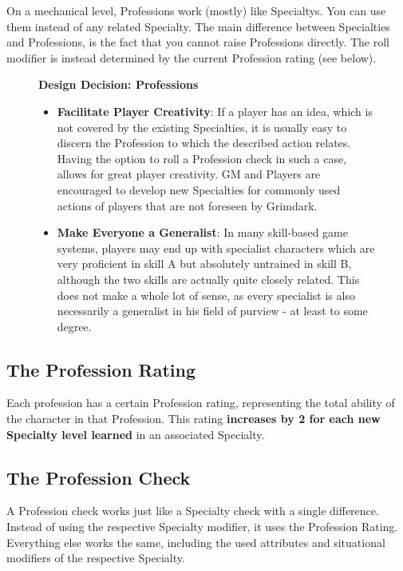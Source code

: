 On a mechanical level, Professions work (mostly) like Specialtys.
You can use them instead of any related Specialty.
The main difference between Specialties and Professions, is the fact that you cannot raise Professions directly.
The roll modifier is instead determined by the current Profession rating (see below).

\begin{figure}[hb]
	\begin{DndReadAloud}
	\textbf{Design Decision: Professions}
	\begin{itemize}
		\item \textbf{Facilitate Player Creativity}: If a player has an idea, which is not covered by the existing Specialties, it is usually easy to discern the Profession to which the described action relates. Having the option to roll a Profession check in such a case, allows for great player creativity. GM and Players are encouraged to develop new Specialties for commonly used actions of players that are not foreseen by Grimdark.
		\item \textbf{Make Everyone a Generalist}: In many skill-based game systems, players may end up with specialist characters which are very proficient in skill A but absolutely untrained in skill B, although the two skills are actually quite closely related. This does not make a whole lot of sense, as every specialist is also necessarily a generalist in his field of purview - at least to some degree.
		\end{itemize}
	\end{DndReadAloud}
\end{figure}

\subsection{The Profession Rating}
Each profession has a certain Profession rating, representing the total ability of the character in that Profession. 
This rating \textbf{increases by 2 for each new Specialty level learned} in an associated Specialty.

\subsection{The Profession Check}
A Profession check works just like a Specialty check with a single difference.
Instead of using the respective Specialty modifier, it uses the Profession Rating.
Everything else works the same, including the used attributes and situational modifiers of the respective Specialty.

